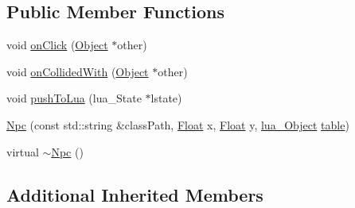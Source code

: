 \subsection*{Public Member Functions}
\begin{DoxyCompactItemize}
\item 
void \hyperlink{classZeta_1_1Npc_a38560c0741970ce44ae9e0e2fe1e1d71}{on\+Click} (\hyperlink{classZeta_1_1Object}{Object} $\ast$other)
\item 
void \hyperlink{classZeta_1_1Npc_a2e042037eb5d4659e2d14261cc2c56c1}{on\+Collided\+With} (\hyperlink{classZeta_1_1Object}{Object} $\ast$other)
\item 
void \hyperlink{classZeta_1_1Npc_a0943cb88b0b4bcc18a4c19f4c9b8b060}{push\+To\+Lua} (lua\+\_\+\+State $\ast$lstate)
\item 
\hyperlink{classZeta_1_1Npc_a0b6df1693c3f19a67f1f2f1a37167f79}{Npc} (const std\+::string \&class\+Path, \hyperlink{namespaceZeta_a1e0a1265f9b3bd3075fb0fabd39088ba}{Float} x, \hyperlink{namespaceZeta_a1e0a1265f9b3bd3075fb0fabd39088ba}{Float} y, \hyperlink{ZetaConfig_8hpp_ae7be32b73848041a60f2412f72bbb221}{lua\+\_\+\+Object} \hyperlink{classZeta_1_1Lifeform_a21a6e67148dc921adb0ae02af0e8e729}{table})
\item 
virtual \hyperlink{classZeta_1_1Npc_a852df40c2c31e687bc188a790141840b}{$\sim$\+Npc} ()
\end{DoxyCompactItemize}
\subsection*{Additional Inherited Members}



